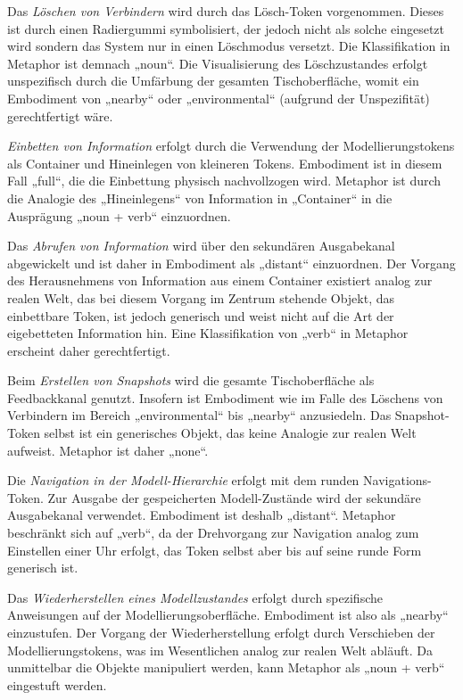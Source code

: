Das \emph{Löschen von Verbindern} wird durch das Lösch-Token vorgenommen. Dieses ist durch einen Radiergummi symbolisiert, der jedoch nicht als solche eingesetzt wird sondern das System nur in einen Löschmodus versetzt. Die Klassifikation in Metaphor ist demnach „noun“. Die Visualisierung des Löschzustandes erfolgt unspezifisch durch die Umfärbung der gesamten Tischoberfläche, womit ein Embodiment von „nearby“ oder „environmental“ (aufgrund der Unspezifität) gerechtfertigt wäre.

\emph{Einbetten von Information} erfolgt durch die Verwendung der Modellierungstokens als Container und Hineinlegen von kleineren Tokens. Embodiment ist in diesem Fall „full“, die die Einbettung physisch nachvollzogen wird. Metaphor ist durch die Analogie des „Hineinlegens“ von Information in „Container“ in die Ausprägung „noun + verb“ einzuordnen.

Das \emph{Abrufen von Information} wird über den sekundären Ausgabekanal abgewickelt und ist daher in Embodiment als „distant“ einzuordnen. Der Vorgang des Herausnehmens von Information aus einem Container existiert analog zur realen Welt, das bei diesem Vorgang im Zentrum stehende Objekt, das einbettbare Token, ist jedoch generisch und weist nicht auf die Art der eigebetteten Information hin. Eine Klassifikation von „verb“ in Metaphor erscheint daher gerechtfertigt.

Beim \emph{Erstellen von Snapshots} wird die gesamte Tischoberfläche als Feedbackkanal genutzt. Insofern ist Embodiment wie im Falle des Löschens von Verbindern im Bereich „environmental“ bis „nearby“ anzusiedeln. Das Snapshot-Token selbst ist ein generisches Objekt, das keine Analogie zur realen Welt aufweist. Metaphor ist daher „none“.

Die \emph{Navigation in der Modell-Hierarchie} erfolgt mit dem runden Navigations-Token. Zur Ausgabe der gespeicherten Modell-Zustände wird der sekundäre Ausgabekanal
verwendet. Embodiment ist deshalb „distant“. Metaphor beschränkt sich auf „verb“, da der Drehvorgang zur Navigation analog zum Einstellen einer Uhr erfolgt, das Token selbst aber bis auf seine runde Form generisch ist.

Das \emph{Wiederherstellen eines Modellzustandes} erfolgt durch spezifische Anweisungen auf der Modellierungsoberfläche. Embodiment ist also als „nearby“ einzustufen. Der Vorgang der Wiederherstellung erfolgt durch Verschieben der Modellierungstokens, was im Wesentlichen analog zur realen Welt abläuft. Da unmittelbar die Objekte manipuliert werden, kann Metaphor als „noun + verb“ eingestuft werden.

